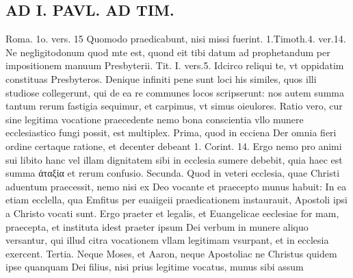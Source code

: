 \documentclass{article}
\begin{document}
\begin{pages}
\section*{AD I. PAVL. AD TIM. }
\marginpar{[ p.42 ]}\pstart Roma. 1o. vers. 15 Quomodo praedicabunt, nisi missi fuerint.  \pend\pstart 1.Timoth.4. ver.14. Ne negligitodonum quod mte est, quond eit tibi datum ad prophetandum per impositionem manuum Presbyterii.  \pend\pstart Tit. I. vers.5. Idcirco reliqui te, vt oppidatim constituas Presbyteros.  \pend\pstart Denique infiniti pene sunt loci his similes, quos illi studiose collegerunt, qui de ea re communes locos scripserunt: nos autem summa tantum rerum fastigia sequimur, et carpimus, vt simus oieulores.  \pend\pstart Ratio vero, cur sine legitima vocatione praecedente nemo bona conscientia vllo munere ecclesiastico fungi possit, est multiplex.  \pend\pstart Prima, quod in ecciena Der omnia fieri ordine certaque ratione, et decenter debeant 1. Corint. 14. Ergo nemo pro animi sui libito hanc vel illam dignitatem sibi in ecclesia sumere debebit, quia haec est summa ἀταξία et rerum confusio.  \pend\pstart Secunda. Quod in veteri ecclesia, quae Christi aduentum praecessit, nemo nisi ex Deo vocante et praecepto munus habuit: In ea etiam ecclella, qua Emfitus per euaiigeii praedicationem instaurauit, Apostoli ipsi a Christo vocati sunt. Ergo praeter et legalis, et Euangelicae eeclesiae for mam, praecepta, et instituta idest praeter ipsum Dei verbum in munere aliquo versantur, qui illud citra vocationem vllam legitimam vsurpant, et in ecclesia exercent.  \pend\pstart Tertia. Neque Moses, et Aaron, neque  Apostoliac ne Christus quidem ipse quanquam Dei filius, nisi prius legitime vocatus, munus sibi assum\pend

\end{pages}
\end{document}
